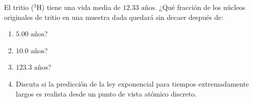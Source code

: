\item El tritio ($^{3}\text{H}$) tiene una vida media de $12.33\text{ años}$. ¿Qué fracción de los núcleos originales de tritio en una muestra dada quedará sin decaer después de:
\begin{enumerate}
    \item $5.00\text{ años}$?
    \item $10.0\text{ años}$?
    \item $123.3\text{ años}$?
    \item Discuta si la predicción de la ley exponencial para tiempos extremadamente largos es realista desde un punto de vista atómico discreto.
\end{enumerate}